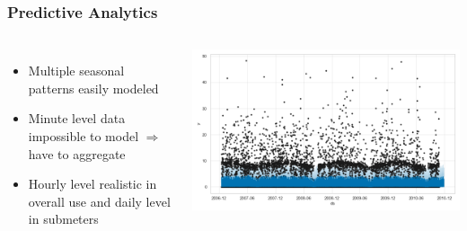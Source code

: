 \documentclass[10pt]{beamer}
\begin{document}
\begin{frame}
\frametitle{Predictive Analytics}

\begin{columns}[c] %


\begin{itemize}
    \item Multiple seasonal patterns easily modeled
    \item Minute level data impossible to model \(\Rightarrow \) have to aggregate
    \item Hourly level realistic in overall use and daily level in submeters
\end{itemize}

\medskip
{
    \centering
    \includegraphics[width=\textwidth,height=\textheight,keepaspectratio]{prophet_forecast.png}
    \par
}


\end{columns}
\end{frame}
\end{document}
